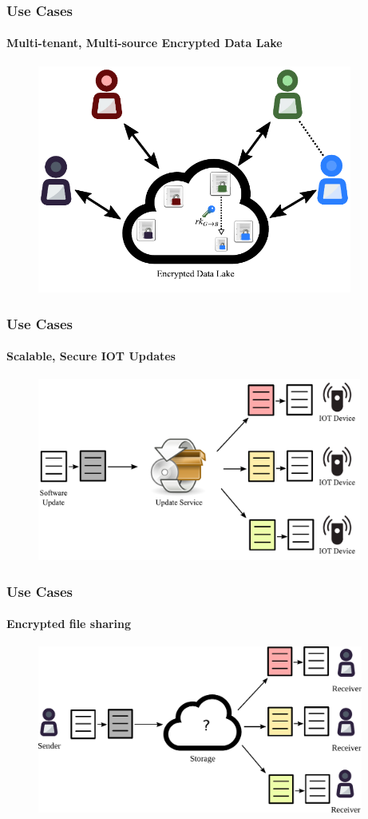 \documentclass[xetex,mathsans,sans,aspectratio=169]{beamer}
\begin{document}
    \begin{frame}
        \frametitle{Use Cases}
        \framesubtitle{Multi-tenant, Multi-source Encrypted Data Lake}
        \begin{figure}
            \centering
            \includegraphics[height=7.5cm]{pdf/data-lake.pdf}
        \end{figure}
    \end{frame}

    \begin{frame}
        \frametitle{Use Cases}
        \framesubtitle{Scalable, Secure IOT Updates}
        \begin{figure}
            \centering
            \includegraphics[height=6cm]{pdf/iot-updates.pdf}
        \end{figure}
    \end{frame}

    \begin{frame}
        \frametitle{Use Cases}
        \framesubtitle{Encrypted file sharing}
        \begin{figure}
            \centering
            \includegraphics[height=5.5cm]{pdf/file-sharing.pdf}
        \end{figure}
    \end{frame}
\end{document}
